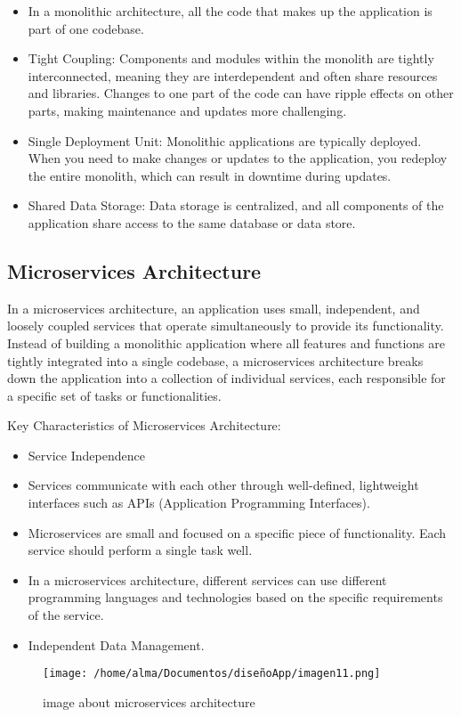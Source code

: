 \documentclass[12pt,a4paper]{article}
\begin{document}
\begin{itemize}
    \item In a monolithic architecture, all the code that makes up the application is part of one codebase. 
    
    \item Tight Coupling: Components and modules within the monolith are tightly interconnected, meaning they are interdependent and often share resources and libraries. Changes to one part of the code can have ripple effects on other parts, making maintenance and updates more challenging.
    
    \item Single Deployment Unit: Monolithic applications are typically deployed. When you need to make changes or updates to the application, you redeploy the entire monolith, which can result in downtime during updates.
    
   \item Shared Data Storage: Data storage is centralized, and all components of the application share access to the same database or data store.

\end{itemize}

\subsection{Microservices Architecture }
\justify In a microservices architecture, an application uses small, independent, and loosely coupled services that operate simultaneously to provide its functionality. 
Instead of building a monolithic application where all features and functions are tightly integrated into a single codebase, a microservices architecture breaks down the application into a collection of individual services, each responsible for a specific set of tasks or functionalities.

Key Characteristics of Microservices Architecture:

\begin{itemize}
\item Service Independence
    
\item Services communicate with each other through well-defined, lightweight interfaces such as APIs (Application Programming Interfaces). 

\item Microservices are small and focused on a specific piece of functionality. Each service should perform a single task well. 

\item In a microservices architecture, different services can use different programming languages and technologies based on the specific requirements of the service. 

\item Independent Data Management.

\end{itemize}
\begin{figure}[h]
    \centering
    \texttt{[image: /home/alma/Documentos/diseñoApp/imagen11.png]}
    \caption{image about microservices architecture}
    \label{fig:etiqueta}
\end{figure}
\end{document}
